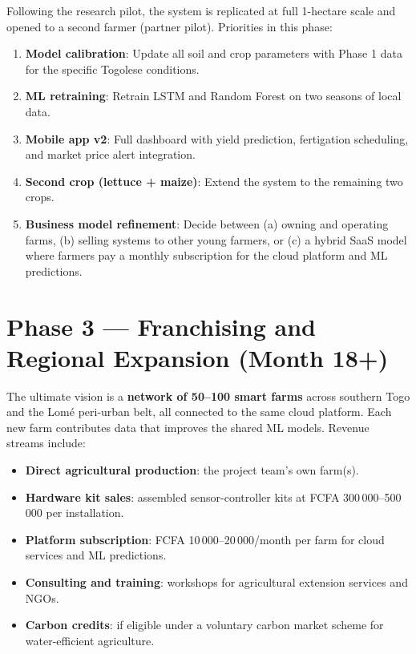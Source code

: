 \documentclass[12pt, a4paper]{report}
\begin{document}
Following the research pilot, the system is replicated at full 1-hectare scale and opened to a second farmer (partner pilot). Priorities in this phase:

\begin{enumerate}[leftmargin=2em]
  \item \textbf{Model calibration}: Update all soil and crop parameters with Phase 1 data for the specific Togolese conditions.
  \item \textbf{ML retraining}: Retrain LSTM and Random Forest on two seasons of local data.
  \item \textbf{Mobile app v2}: Full dashboard with yield prediction, fertigation scheduling, and market price alert integration.
  \item \textbf{Second crop (lettuce + maize)}: Extend the system to the remaining two crops.
  \item \textbf{Business model refinement}: Decide between (a) owning and operating farms, (b) selling systems to other young farmers, or (c) a hybrid SaaS model where farmers pay a monthly subscription for the cloud platform and ML predictions.
\end{enumerate}

\section{Phase 3 — Franchising and Regional Expansion (Month 18+)}

The ultimate vision is a \textbf{network of 50–100 smart farms} across southern Togo and the Lomé peri-urban belt, all connected to the same cloud platform. Each new farm contributes data that improves the shared ML models. Revenue streams include:

\begin{itemize}[leftmargin=2em]
  \item \textbf{Direct agricultural production}: the project team's own farm(s).
  \item \textbf{Hardware kit sales}: assembled sensor-controller kits at FCFA 300\,000–500\,000 per installation.
  \item \textbf{Platform subscription}: FCFA 10\,000–20\,000/month per farm for cloud services and ML predictions.
  \item \textbf{Consulting and training}: workshops for agricultural extension services and NGOs.
  \item \textbf{Carbon credits}: if eligible under a voluntary carbon market scheme for water-efficient agriculture.
\end{itemize}
\end{document}
